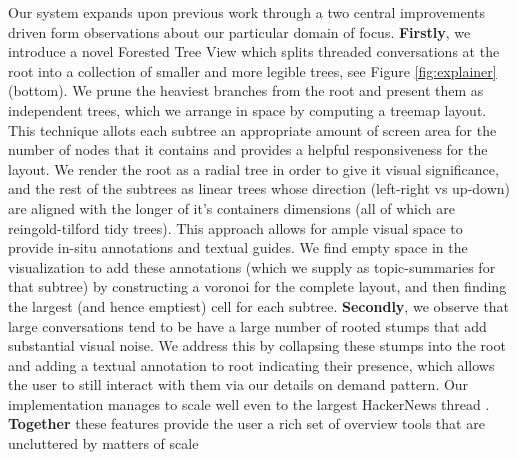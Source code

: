 \documentclass{egpubl}
\begin{document}
Our system expands upon previous work through a two central improvements driven form observations about our particular domain of focus.
%
\textbf{Firstly}, we introduce a novel Forested Tree View which splits threaded conversations at the root into a collection of smaller and more legible trees, see  Figure \ref{fig:explainer} (bottom).%
%
We prune the heaviest branches from the root and present them as independent trees, which we arrange in space by computing a treemap layout.
%
This technique allots each subtree an appropriate amount of screen area for the number of nodes that it contains and provides a helpful responsiveness for the layout.
%
We render the root as a radial tree in order to give it visual significance, and the rest of the subtrees as linear trees whose direction (left-right vs up-down) are aligned with the longer of it's containers dimensions (all of which are reingold-tilford tidy trees).
%
This approach allows for ample visual space to provide in-situ annotations and textual guides. 
%
We find empty space in the visualization to add these annotations (which we supply as topic-summaries for that subtree) by constructing a voronoi for the complete layout, and then finding the largest (and hence emptiest) cell for each subtree.
%
\textbf{Secondly}, we observe that large conversations tend to be have a large number of rooted stumps that add substantial visual noise.
%
We address this by collapsing these stumps into the root and adding a textual annotation to root indicating their presence, which allows the user to still interact with them via our details on demand pattern.
%
Our implementation manages to scale well even to the largest HackerNews thread \cite{hackernews-biggest}.
%
\textbf{Together} these features provide the user a rich set of overview tools that are uncluttered by matters of scale 



\end{document}
